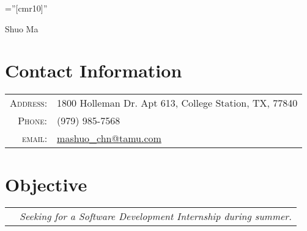 \documentclass[a4paper,10pt]{article}
\begin{document}
\pagestyle{empty} %
\font\fb=''[cmr10]'' %

{\centering
	{\Huge Shuo Ma}
}

\section{Contact Information}

\begin{tabular}{rl}
    \textsc{Address:}   & 1800 Holleman Dr. Apt 613, College Station, TX, 77840 \\
    \textsc{Phone:}     & (979) 985-7568\\
    \textsc{email:}     & \href{mailto:mashuo\_chn@tamu.com}{mashuo\_chn@tamu.com}
\end{tabular}





\section{Objective}
\begin{tabular}{rl}
    &\textit{Seeking for a Software Development Internship during summer.}
\end{tabular}



\end{document}
